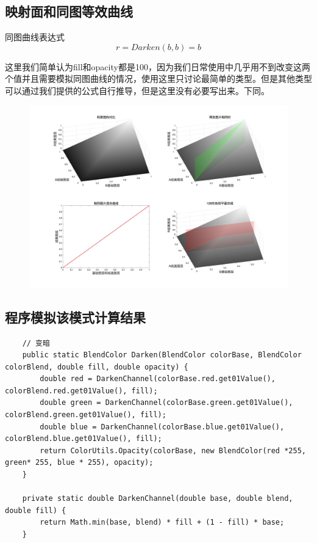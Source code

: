 \subsection{ 映射面和同图等效曲线}
同图曲线表达式
\begin{equation}
	r=Darken(b,b)=b
	\end{equation}
\begin{notice}
	\item 这里我们简单认为fill和opacity都是100，因为我们日常使用中几乎用不到改变这两个值并且需要模拟同图曲线的情况，使用这里只讨论最简单的类型。但是其他类型可以通过我们提供的公式自行推导，但是这里没有必要写出来。下同。
\end{notice}
\begin{figure}[!htb]
	\centering
	\includegraphics[width=1.1\linewidth]{figure/变暗模式.jpg}
	\caption{}
	\label{fig:}
\end{figure}
\newpage
\subsection{ 程序模拟该模式计算结果}
\begin{lstlisting}
	// 变暗
	public static BlendColor Darken(BlendColor colorBase, BlendColor colorBlend, double fill, double opacity) {
		double red = DarkenChannel(colorBase.red.get01Value(), colorBlend.red.get01Value(), fill);
		double green = DarkenChannel(colorBase.green.get01Value(), colorBlend.green.get01Value(), fill);
		double blue = DarkenChannel(colorBase.blue.get01Value(), colorBlend.blue.get01Value(), fill);
		return ColorUtils.Opacity(colorBase, new BlendColor(red *255, green* 255, blue * 255), opacity);
	}
	
	private static double DarkenChannel(double base, double blend, double fill) {
		return Math.min(base, blend) * fill + (1 - fill) * base;
	}
\end{lstlisting}



